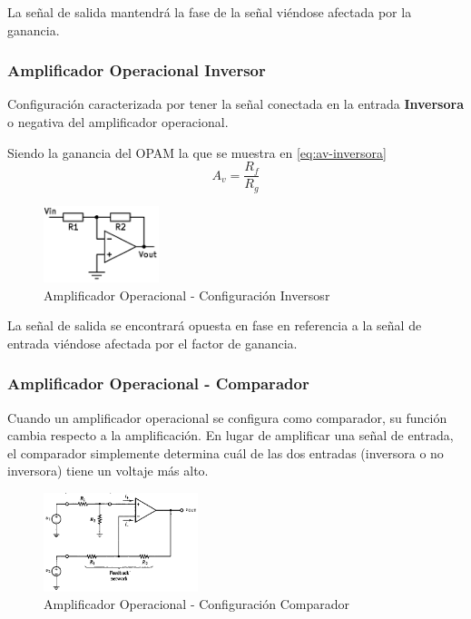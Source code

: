 \documentclass[conference]{IEEEtran}
\begin{document}
	La señal de salida mantendrá la fase de la señal viéndose afectada por la ganancia.
	
	
	\subsubsection{Amplificador Operacional Inversor}
	Configuración caracterizada por tener la señal conectada en la entrada \textbf{Inversora} o negativa del amplificador operacional.
	
	Siendo la ganancia del OPAM la que se muestra en \ref{eq:av-inversora}
	\begin{equation}
		A_v = \frac{R_f}{R_g}
		\label{eq:av-inversora}
	\end{equation}
	
	\begin{figure}[h]
		\centering
		\includegraphics[width=0.3\textwidth]{media/opam-inversor}
		\caption{Amplificador Operacional - Configuración Inversosr}
		\label{fig:opam-inversor}
	\end{figure}
	
	La señal de salida se encontrará opuesta en fase en referencia a la señal de entrada viéndose afectada por el factor de ganancia.
	
	\subsubsection{Amplificador Operacional - Comparador}
	Cuando un amplificador operacional se configura como comparador, su función cambia respecto a la amplificación. En lugar de amplificar una señal de entrada, el comparador simplemente determina cuál de las dos entradas (inversora o no inversora) tiene un voltaje más alto.
	
	\begin{figure}[h]
		\centering
		\includegraphics[width=0.4\textwidth]{media/opam-comparador}
		\caption{Amplificador Operacional - Configuración Comparador}
		\label{fig:opam-comparador}
	\end{figure}
	
\end{document}
